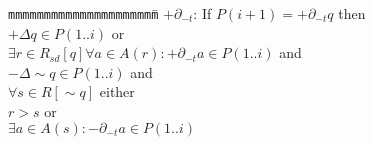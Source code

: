 
\begin{tabbing}
{\tt mmm}\={\tt mmmmmm}\={\tt mmmm}\={\tt mmmm}\={\tt mmmm}\=\kill
\>$+ \partial_{-t}$: If $P(i+1) = + \partial_{-t} q$ then \\
\>\>$+ \Delta q \in P(1..i)$ or \\
\>\>\>$\exists r \in R_{sd}[q] \forall a \in A(r): + \partial_{-t} a \in P(1..i)$ and \\
\>\>\>$- \Delta \sim q \in P(1..i)$ and \\
\>\>\>$\forall s \in R[\sim q]$ either \\
\>\>\>\>$r > s$ or \\
\>\>\>\>$\exists a \in A(s): - \partial_{-t} a \in P(1..i)$
\end{tabbing}
